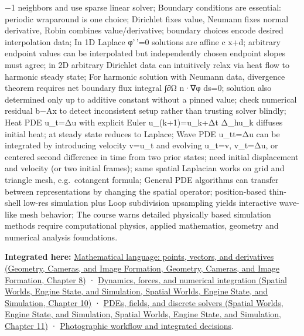−1 neighbors and use sparse linear solver; Boundary conditions are essential: periodic wraparound is one choice; Dirichlet fixes value, Neumann fixes normal derivative, Robin combines value/derivative; boundary choices encode desired interpolation data; In 1D Laplace φ'\,'=0 solutions are affine c x+d; arbitrary endpoint values can be interpolated but independently chosen endpoint slopes must agree; in 2D arbitrary Dirichlet data can intuitively relax via heat flow to harmonic steady state; For harmonic solution with Neumann data, divergence theorem requires net boundary flux integral ∫∂Ω n·∇φ ds=0; solution also determined only up to additive constant without a pinned value; check numerical residual b−Ax to detect inconsistent setup rather than trusting solver blindly; Heat PDE u\_t=Δu with explicit Euler u\_(k+1)=u\_k+Δt Δ\_hu\_k diffuses initial heat; at steady state reduces to Laplace; Wave PDE u\_tt=Δu can be integrated by introducing velocity v=u\_t and evolving u\_t=v, v\_t=Δu, or centered second difference in time from two prior states; need initial displacement and velocity (or two initial frames); same spatial Laplacian works on grid and triangle mesh, e.g.~cotangent formula; General PDE algorithms can transfer between representations by changing the spatial operator; position-based thin-shell low-res simulation plus Loop subdivision upsampling yields interactive wave-like mesh behavior; The course warns detailed physically based simulation methods require computational physics, applied mathematics, geometry and numerical analysis foundations.

\textbf{Integrated here:} \href{../03-Geometry-Cameras-and-Image-Formation/main.pdf\#nameddest=03-visual-computing-i-ch001-mathematical-language-points-vectors-and-derivatives}{Mathematical language: points, vectors, and derivatives (Geometry, Cameras, and Image Formation, Geometry, Cameras, and Image Formation, Chapter 8)} · \href{../05-Spatial-Worlds-Engine-State-and-Simulation/main.pdf\#nameddest=04-visual-computing-ii-ch029-dynamics-forces-and-numerical-integration}{Dynamics, forces, and numerical integration (Spatial Worlds, Engine State, and Simulation, Spatial Worlds, Engine State, and Simulation, Chapter 10)} · \href{../05-Spatial-Worlds-Engine-State-and-Simulation/main.pdf\#nameddest=04-visual-computing-ii-ch030-pdes-fields-and-discrete-solvers}{PDEs, fields, and discrete solvers (Spatial Worlds, Engine State, and Simulation, Spatial Worlds, Engine State, and Simulation, Chapter 11)} · \hyperref[04-visual-computing-ii-ch034-photographic-workflow-and-integrated-decisions]{Photographic workflow and integrated decisions}.

